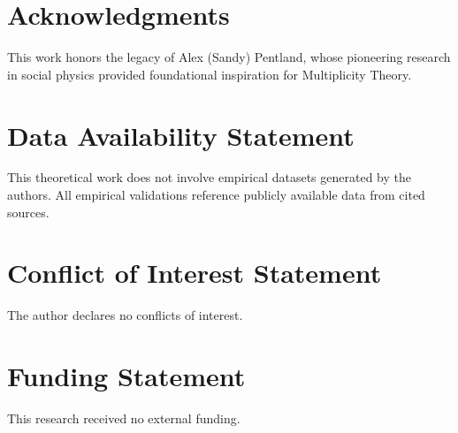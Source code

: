\documentclass[11pt,a4paper]{article}
\begin{document}
\section*{Acknowledgments}

This work honors the legacy of Alex (Sandy) Pentland, whose pioneering research in social physics provided foundational inspiration for Multiplicity Theory.

\section*{Data Availability Statement}

This theoretical work does not involve empirical datasets generated by the authors. All empirical validations reference publicly available data from cited sources.

\section*{Conflict of Interest Statement}

The author declares no conflicts of interest.

\section*{Funding Statement}

This research received no external funding.
\end{document}
